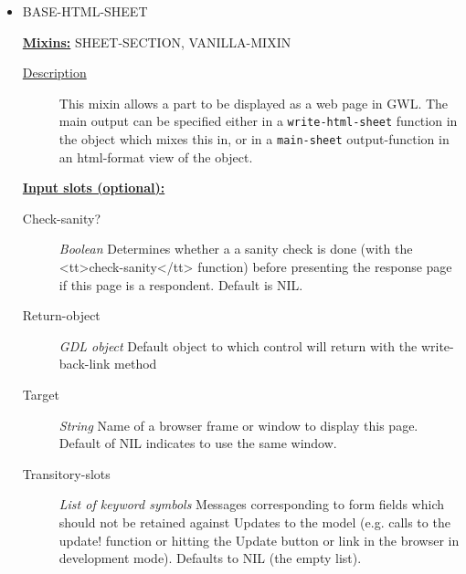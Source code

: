 \documentclass [11pt]{book}
\begin{document}
\begin{itemize}
\begin{description}
\end{description}







\item {}BASE-HTML-SHEET


\textbf{
\underline{Mixins:}} SHEET-SECTION, VANILLA-MIXIN





\begin{description}

\item [
\underline{Description}]


This mixin allows a part to be displayed as a web page in GWL. 
The main output can be specified either in a \texttt{write-html-sheet} function in the object which
mixes  this in, or in a \texttt{main-sheet} output-function in an html-format view of the 
object.



\end{description}








\textbf{
\underline{Input slots (optional):}}

\begin{description}

\item [Check-sanity?]
\emph{Boolean} Determines whether a a sanity check is done (with the <tt>check-sanity</tt> function) before
presenting the response page if this page is a respondent. Default is NIL.


\item [Return-object]
\emph{GDL object} Default object to which control will return with the write-back-link method


\item [Target]
\emph{String} Name of a browser frame or window to display this page. Default of NIL indicates to use the same window.


\item [Transitory-slots]
\emph{List of keyword symbols} Messages corresponding to form fields which should not be retained
against Updates to the model (e.g. calls to the update! function or hitting the Update button or link in
the browser in development mode). Defaults to NIL (the empty list).



\end{description}
\end{itemize}
\end{document}
